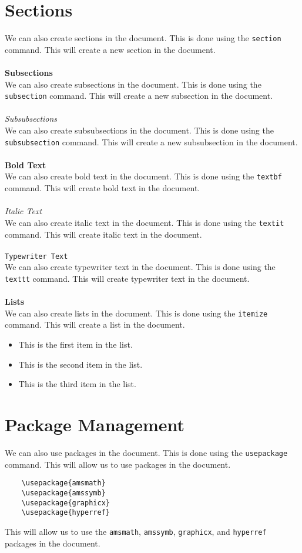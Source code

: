 \documentclass{article}
\begin{document}
\section{Sections}
We can also create sections in the document. This is done using the \texttt{section} command. This will create a new section in the document.\\\\
\textbf{Subsections}\\
We can also create subsections in the document. This is done using the \texttt{subsection} command. This will create a new subsection in the document.\\\\
\textit{Subsubsections}\\
We can also create subsubsections in the document. This is done using the \texttt{subsubsection} command. This will create a new subsubsection in the document.\\\\
\textbf{Bold Text}\\
We can also create bold text in the document. This is done using the \texttt{textbf} command. This will create bold text in the document.\\\\
\textit{Italic Text}\\
We can also create italic text in the document. This is done using the \texttt{textit} command. This will create italic text in the document.\\\\
\texttt{Typewriter Text}\\
We can also create typewriter text in the document. This is done using the \texttt{texttt} command. This will create typewriter text in the document.\\\\
\textbf{Lists}\\
We can also create lists in the document. This is done using the \texttt{itemize} command. This will create a list in the document.\\
\begin{itemize}
    \item This is the first item in the list.
    \item This is the second item in the list.
    \item This is the third item in the list.
\end{itemize}
\newpage
\section{Package Management}
We can also use packages in the document. This is done using the \texttt{usepackage} command. This will allow us to use packages in the document.\\
\begin{verbatim}
    \usepackage{amsmath}
    \usepackage{amssymb}
    \usepackage{graphicx}
    \usepackage{hyperref}
\end{verbatim}
This will allow us to use the \texttt{amsmath}, \texttt{amssymb}, \texttt{graphicx}, and \texttt{hyperref} packages in the document.\\
\end{document}
